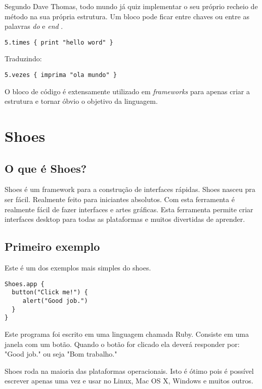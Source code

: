 \documentclass[espaco=simples,appendix=Name]{abnt}
\begin{document}
\cite{programmingRuby}
Segundo Dave Thomas, todo mundo já quiz implementar o seu próprio recheio de método na sua própria estrutura. Um bloco pode ficar entre chaves ou entre as palavras \textit{ do } e \textit{ end }.

\begin{lstlisting}[caption=Exemplo de bloco de código ]
   5.times { print "hello word" }
\end{lstlisting}

Traduzindo: 
\begin{lstlisting}[caption=Exemplo de bloco de código ]
   5.vezes { imprima "ola mundo" }
\end{lstlisting}

O bloco de código é extensamente utilizado em \textit{frameworks} para apenas criar a estrutura e tornar óbvio o objetivo da linguagem.



\chapter{ Shoes }

\section{O que é Shoes?}

Shoes é um framework para a construção de interfaces rápidas. Shoes nasceu pra ser fácil. Realmente feito para iniciantes absolutos. Com esta ferramenta é realmente fácil de fazer interfaces e artes gráficas. 
Esta ferramenta permite criar interfaces desktop para todas as plataformas e muitos divertidas de aprender.

\section{ Primeiro exemplo }

Este é um dos exemplos mais simples do shoes. 

\begin{lstlisting}[caption=Primeiro exemplo do framework Shoes  ]
Shoes.app { 
  button("Click me!") {
     alert("Good job.") 
  }
} 
\end{lstlisting}

Este programa foi escrito em uma linguagem chamada Ruby. Consiste em uma janela com um botão. Quando o botão for clicado ela deverá responder por: "Good job." ou seja "Bom trabalho."

Shoes roda na maioria das plataformas operacionais. Isto é ótimo pois é possível escrever apenas uma vez e usar no Linux, Mac OS X, Windows e muitos outros.
\end{document}

